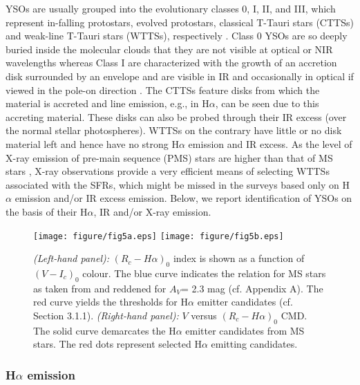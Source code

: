 \documentclass[a4paper,fleqn,usenatbib,useAMS]{mnras}
\begin{document}
YSOs are usually grouped into the evolutionary classes 0, I, II, and III, which represent
in-falling protostars, evolved protostars, classical T-Tauri stars (CTTSs) and weak-line 
T-Tauri stars (WTTSs), respectively \citep[cf.][]{1999ARAA..37..363F}. Class 0
YSOs are so deeply buried inside the molecular clouds that they are not visible at optical or NIR
wavelengths 
whereas Class I are characterized with the growth of an accretion disk surrounded by an envelope and are 
visible in IR and occasionally in optical if viewed in the pole-on direction 
\citep{2005A&A...429..543N,2007prpl.conf..117W,2011ARA&A..49...67W}.
The CTTSs feature disks from which the material is accreted and 
line emission, e.g., in H$\alpha$, can be seen due to this accreting material. These disks can also be probed through
their IR excess (over the normal stellar photospheres). WTTSs on the contrary have little
or no disk material left and hence have no strong H$\alpha$ emission and IR excess.
As the level of X-ray emission of pre-main sequence (PMS) stars are higher than that of MS stars 
\citep[e.g.,][]{1999ARA&A..37..363F,2002ApJ...574..258F,2003SSRv..108..577F,2004A&ARv..12...71G,2012A&A...539A..74C},
X-ray observations provide a very efficient means of
selecting WTTSs associated with the SFRs, which might be missed in the surveys 
based only on  H$\alpha$ emission and/or IR excess emission.
Below, we report identification of YSOs on the basis of their
H$\alpha$, IR and/or X-ray emission.



\begin{figure}
\centering\texttt{[image: figure/fig5a.eps]}
\centering\texttt{[image: figure/fig5b.eps]}
\caption{\label{halp} {\it (Left-hand panel):} $(R_c- H\alpha)_0$ index is shown as a function of $(V-I_c)_0$
colour. The blue curve indicates the relation for MS stars as taken from
\citet{1997AJ....114.2644S} and reddened for $A_V$= 2.3 mag (cf. Appendix A). The red curve yields
the thresholds for H$\alpha$ emitter candidates (cf. Section 3.1.1). {\it (Right-hand panel):} $V$ versus $(R_c - H\alpha)_0$ CMD.
The solid curve demarcates the  H$\alpha$ emitter candidates from MS stars. 
The red dots represent selected H$\alpha$ emitting candidates.}
\end{figure}



\subsubsection{H$\alpha$ emission}
\end{document}
